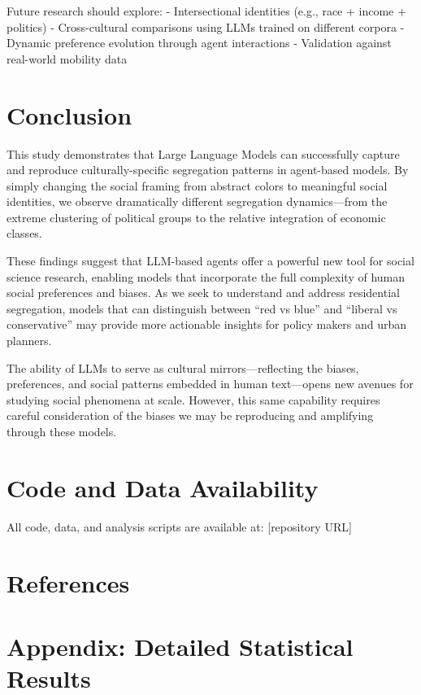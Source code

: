 \documentclass[
  11pt,
]{article}
\begin{document}
Future research should explore: - Intersectional identities (e.g., race
+ income + politics) - Cross-cultural comparisons using LLMs trained on
different corpora - Dynamic preference evolution through agent
interactions - Validation against real-world mobility data

\section{Conclusion}\label{conclusion}

This study demonstrates that Large Language Models can successfully
capture and reproduce culturally-specific segregation patterns in
agent-based models. By simply changing the social framing from abstract
colors to meaningful social identities, we observe dramatically
different segregation dynamics---from the extreme clustering of
political groups to the relative integration of economic classes.

These findings suggest that LLM-based agents offer a powerful new tool
for social science research, enabling models that incorporate the full
complexity of human social preferences and biases. As we seek to
understand and address residential segregation, models that can
distinguish between ``red vs blue'' and ``liberal vs conservative'' may
provide more actionable insights for policy makers and urban planners.

The ability of LLMs to serve as cultural mirrors---reflecting the
biases, preferences, and social patterns embedded in human text---opens
new avenues for studying social phenomena at scale. However, this same
capability requires careful consideration of the biases we may be
reproducing and amplifying through these models.

\section{Code and Data Availability}\label{code-and-data-availability}

All code, data, and analysis scripts are available at: {[}repository
URL{]}

\section{References}\label{references}

\label{refs}

\section{Appendix: Detailed Statistical
Results}\label{appendix-detailed-statistical-results}
\end{document}
